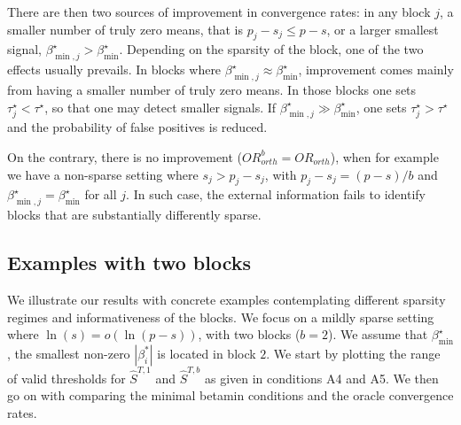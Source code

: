\documentclass[aos]{imsart}
\theoremstyle{plain}
\begin{document}
There are then two sources of improvement in convergence rates: in any block $j$, a smaller number of truly zero means, that is $p_j-s_j\leq p-s$, or a larger smallest signal, $\beta^\star_{\min,j} > \beta_{\min}^\star$. Depending on the sparsity of the block, one of the two effects usually prevails. In blocks where $\beta^\star_{\min,j} \approx \beta_{\min}^\star$, improvement comes mainly from having a smaller number of truly zero means. In those blocks
one sets $\tau^\star_j < \tau^\star$,
so that one may detect smaller signals. 
If %
$\beta^\star_{\min,j} \gg \beta_{\min}^\star$,
one sets $\tau^\star_j > \tau^\star$
and the probability of false positives is reduced.

On the contrary, there is no improvement %
(${OR}^b_{orth}={OR}_{orth}$), %
when for example %
we have a non-sparse setting where $s_j>p_j-s_j$, with
$p_j-s_j=(p-s)/b$ and $\beta^\star_{\min,j}=\beta_{\min}^\star$ for all $j$. In such case, the external information fails to identify blocks that are substantially differently sparse. 

\subsection{Examples with two blocks}\label{sec:examples}

We illustrate our results with concrete examples contemplating different sparsity regimes and informativeness of the blocks. %
We focus on a mildly sparse setting where $\ln(s)=o(\ln(p-s))$, with two blocks ($b=2$). We assume that $\beta_{\min}^{\star}$, the smallest non-zero $|\beta_i^*|$ %
is located in block $2$. We start by plotting the range of valid thresholds for $\hat{S}^{T,1}$ and $\hat{S}^{T,b}$ as given in conditions A4 and A5. We then go on with comparing the minimal betamin conditions and the %
oracle convergence rates.
\end{document}
